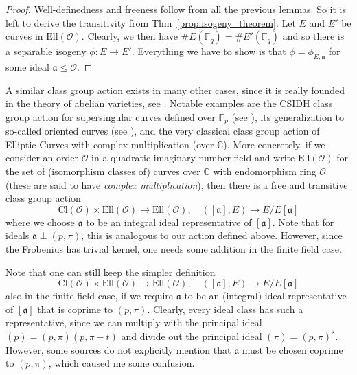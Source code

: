 \documentclass{ociamthesis}
\newcommand{\F}{\mathbb{F}}
\newcommand{\C}{\mathbb{C}}
\newcommand{\Cl}{\mathrm{Cl}}
\renewcommand{\a}{\mathfrak{a}}
\newcommand{\Ell}{\mathrm{Ell}}
\renewcommand{\O}{\mathcal{O}}
\theoremstyle{definition}
\begin{document}
\begin{proof}
    Well-definedness and freeness follow from all the previous lemmas.
    So it is left to derive the transitivity from Thm~\ref{prop:isogeny_theorem}.
    Let $E$ and $E'$ be curves in $\Ell(\O)$.
    Clearly, we then have $\#E(\F_q) = \#E'(\F_q)$ and so there is a separable isogeny $\phi: E \to E'$.
    Everything we have to show is that $\phi = \phi_{E, \a}$ for some ideal $\a \leq \O$.

    
\end{proof}
A similar class group action exists in many other cases, since it is really founded in the theory of abelian varieties, see \cite{class_group_action_waterhouse}.
Notable examples are the CSIDH class group action for supersingular curves defined over $\F_p$ (see \cite{csidh}), its generalization to so-called oriented curves (see \cite{osidh}), and the very classical class group action of Elliptic Curves with complex multiplication (over $\C$).
More concretely, if we consider an order $\O$ in a quadratic imaginary number field and write $\Ell(\O)$ for the set of (isomorphism classes of) curves over $\C$ with endomorphism ring $\O$ (these are said to have \emph{complex multiplication}), then there is a free and transitive class group action
\begin{equation*}
    \Cl(\O) \times \Ell(\O) \to \Ell(\O), \quad ([\a], E) \to E/E[\a]
\end{equation*}
where we choose $\a$ to be an integral ideal representative of $[\a]$.
Note that for ideals $\a \perp (p, \pi)$, this is analogous to our action defined above.
However, since the Frobenius has trivial kernel, one needs some addition in the finite field case.

Note that one can still keep the simpler definition
\begin{equation*}
    \Cl(\O) \times \Ell(\O) \to \Ell(\O), \quad ([\a], E) \to E/E[\a]
\end{equation*}
also in the finite field case, if we require $\a$ to be an (integral) ideal representative of $[\a]$ that is coprime to $(p, \pi)$.
Clearly, every ideal class has such a representative, since we can multiply with the principal ideal $(p) = (p, \pi)(p, \pi - t)$ and divide out the principal ideal $(\pi) = (p, \pi)^s$.
However, some sources do not explicitly mention that $\a$ must be chosen coprime to $(p, \pi)$, which caused me some confusion.
\end{document}
